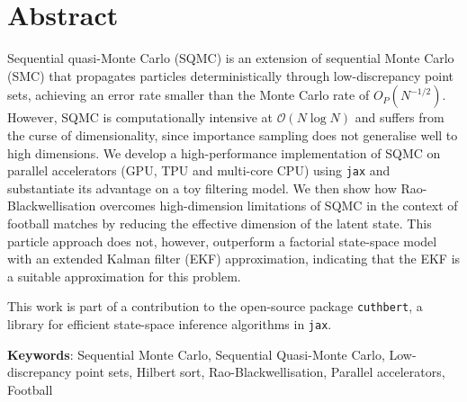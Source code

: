 \chapter*{Abstract}
Sequential quasi-Monte Carlo (SQMC) is an extension of sequential Monte Carlo (SMC) that propagates particles deterministically through low-discrepancy point sets, achieving an error rate smaller than the Monte Carlo rate of $O_P(N^{-1/2})$. However, SQMC is computationally intensive at $\mathcal{O}(N \log N)$ and suffers from the curse of dimensionality, since importance sampling does not generalise well to high dimensions. We develop a high-performance implementation of SQMC on parallel accelerators (GPU, TPU and multi-core CPU) using \texttt{jax} and substantiate its advantage on a toy filtering model. We then show how Rao-Blackwellisation overcomes high-dimension limitations of SQMC in the context of football matches by reducing the effective dimension of the latent state. This particle approach does not, however, outperform a factorial state-space model with an extended Kalman filter (EKF) approximation, indicating that the EKF is a suitable approximation for this problem.

This work is part of a contribution to the open-source package \texttt{cuthbert}, a library for efficient state-space inference algorithms in \texttt{jax}.

\textbf{Keywords}: Sequential Monte Carlo, Sequential Quasi-Monte Carlo, Low-discrepancy point sets, Hilbert sort, Rao-Blackwellisation, Parallel accelerators, Football



